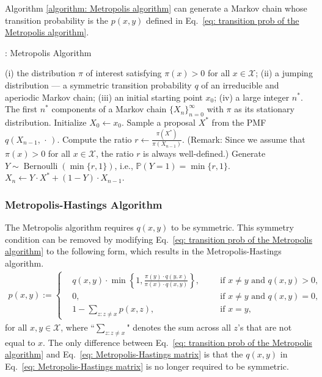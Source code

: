 \documentclass[11pt,letterpaper, leqno]{article}
\numberwithin{equation}{section}
\numberwithin{theorem}{section}
\numberwithin{lemma}{section}
\numberwithin{corollary}{section}
\numberwithin{definition}{section}
\numberwithin{proposition}{section}
\numberwithin{remark}{section}
\numberwithin{example}{section}
\begin{document}
Algorithm \ref{algorithm: Metropolis algorithm} can generate a Markov chain whose transition probability is the $p(x,y)$ defined in Eq.~\eqref{eq: transition prob of the Metropolis algorithm}.
\begin{algorithm}
\caption{: Metropolis Algorithm}\label{algorithm: Metropolis algorithm}
\begin{algorithmic}[1]
    \INPUT (i) the distribution $\pi$ of interest satisfying $\pi(x)>0$ for all $x\in\mathcal{X}$; (ii) a jumping distribution --- a symmetric transition probability $q$ of an irreducible and aperiodic Markov chain; (iii) an initial starting point $x_0$; (iv) a large integer $n^*$.
    \OUTPUT The first $n^*$ components of a Markov chain $\{X_n\}_{n=0}^\infty$ with $\pi$ as its stationary distribution.
    \STATE Initialize $X_0 \leftarrow x_0$.
    \STATE Sample a proposal $X^*$ from the PMF $q(X_{n-1},\, \cdot\,)$.
    \STATE Compute the ratio $r\leftarrow\frac{\pi(X^*)}{\pi(X_{n-1})}$. (Remark: Since we assume that $\pi(x)>0$ for all $x\in\mathcal{X}$, the ratio $r$ is always well-defined.)
    \STATE Generate $Y\sim \operatorname{Bernoulli}(\min\{r,1\})$, i.e., $\mathbb{P}(Y=1)=\min\{r,1\}$.
    \STATE $X_n \leftarrow Y\cdot X^* + (1-Y)\cdot X_{n-1}$.
    \ENDFOR
\end{algorithmic}
\end{algorithm}

\subsubsection{Metropolis-Hastings Algorithm}

The Metropolis algorithm requires $q(x,y)$ to be symmetric. This symmetry condition can be removed by modifying Eq.~\eqref{eq: transition prob of the Metropolis algorithm} to the following form, which results in the Metropolis-Hastings algorithm.
\begin{align}\label{eq: Metropolis-Hastings matrix}
    p(x,y):=\left\{
    \begin{aligned}
    & q(x,y)\cdot\min\left\{1, \frac{\pi(y)\cdot q(y,x)}{\pi(x)\cdot q(x,y)}\right\},\ \ &&\mbox{ if }x\ne y \mbox{ and }q(x,y)>0, \\
    & 0, \ \ &&\mbox{ if }x\ne y \mbox{ and }q(x,y)=0, \\
    & 1-\sum_{z:z\ne x} p(x,z), \ \ &&\mbox{ if }x=y,
    \end{aligned}
    \right.
\end{align}
for all $x,y\in\mathcal{X}$, where ``$\sum_{z:z\ne x}$" denotes the sum across all $z$'s that are not equal to $x$. The only difference between Eq.~\eqref{eq: transition prob of the Metropolis algorithm} and Eq.~\eqref{eq: Metropolis-Hastings matrix} is that the $q(x,y)$ in Eq.~\eqref{eq: Metropolis-Hastings matrix} is no longer required to be symmetric.
\end{document}
